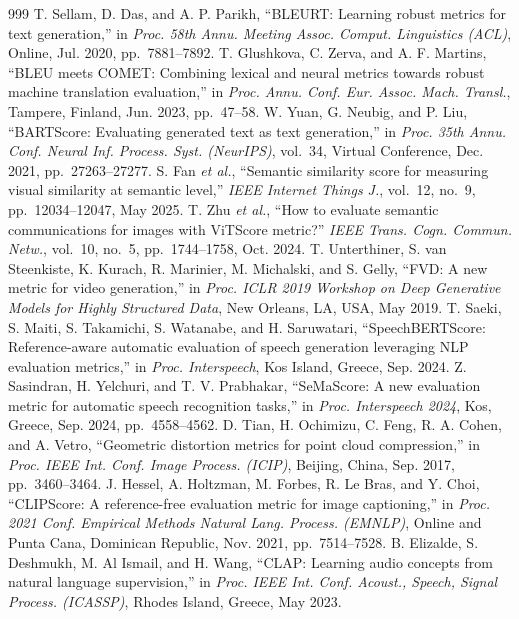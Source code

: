 \begin{thebibliography}{999}
 T. Sellam, D. Das, and A. P. Parikh, ``BLEURT: Learning robust metrics for text generation,'' in \emph{Proc. 58th Annu. Meeting Assoc. Comput. Linguistics (ACL)}, Online, Jul. 2020, pp.~7881--7892.
 T. Glushkova, C. Zerva, and A. F. Martins, ``BLEU meets COMET: Combining lexical and neural metrics towards robust machine translation evaluation,'' in \emph{Proc. Annu. Conf. Eur. Assoc. Mach. Transl.}, Tampere, Finland, Jun. 2023, pp.~47--58.
 W. Yuan, G. Neubig, and P. Liu, ``BARTScore: Evaluating generated text as text generation,'' in \emph{Proc. 35th Annu. Conf. Neural Inf. Process. Syst. (NeurIPS)}, vol.~34, Virtual Conference, Dec. 2021, pp.~27263--27277.
 S. Fan \emph{et al.}, ``Semantic similarity score for measuring visual similarity at semantic level,'' \emph{IEEE Internet Things J.}, vol.~12, no.~9, pp.~12034--12047, May 2025.
 T. Zhu \emph{et al.}, ``How to evaluate semantic communications for images with ViTScore metric?'' \emph{IEEE Trans. Cogn. Commun. Netw.}, vol.~10, no.~5, pp.~1744--1758, Oct. 2024.
 T. Unterthiner, S. van Steenkiste, K. Kurach, R. Marinier, M. Michalski, and S. Gelly, ``FVD: A new metric for video generation,'' in \emph{Proc. ICLR 2019 Workshop on Deep Generative Models for Highly Structured Data}, New Orleans, LA, USA, May 2019.
 T. Saeki, S. Maiti, S. Takamichi, S. Watanabe, and H. Saruwatari, ``SpeechBERTScore: Reference-aware automatic evaluation of speech generation leveraging NLP evaluation metrics,'' in \emph{Proc. Interspeech}, Kos Island, Greece, Sep. 2024.
 Z. Sasindran, H. Yelchuri, and T. V. Prabhakar, ``SeMaScore: A new evaluation metric for automatic speech recognition tasks,'' in \emph{Proc. Interspeech 2024}, Kos, Greece, Sep. 2024, pp.~4558--4562.
 D. Tian, H. Ochimizu, C. Feng, R. A. Cohen, and A. Vetro, ``Geometric distortion metrics for point cloud compression,'' in \emph{Proc. IEEE Int. Conf. Image Process. (ICIP)}, Beijing, China, Sep. 2017, pp.~3460--3464.
 J. Hessel, A. Holtzman, M. Forbes, R. Le Bras, and Y. Choi, ``CLIPScore: A reference-free evaluation metric for image captioning,'' in \emph{Proc. 2021 Conf. Empirical Methods Natural Lang. Process. (EMNLP)}, Online and Punta Cana, Dominican Republic, Nov. 2021, pp.~7514--7528.
 B. Elizalde, S. Deshmukh, M. Al Ismail, and H. Wang, ``CLAP: Learning audio concepts from natural language supervision,'' in \emph{Proc. IEEE Int. Conf. Acoust., Speech, Signal Process. (ICASSP)}, Rhodes Island, Greece, May 2023.

\end{thebibliography}
